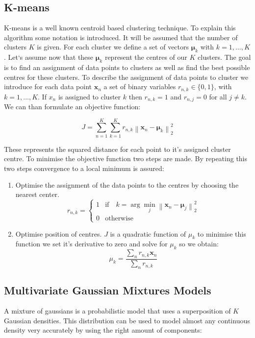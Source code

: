 \documentclass[cic,tc,english]{iiufrgs}
\newcommand{\norm}[1]{\left\lVert #1 \right\rVert_{2}}
\begin{document}
\subsection{K-means}
K-means is a well known centroid based clustering technique. To explain this algorithm some notation is introduced. It will be assumed that the number of clusters $K$ is given. For each cluster we define a set of vectors $\bm{\mu}_k$ with $k = 1,\ldots,K$. Let`s assume now that these $\bm{\mu}_k$ represent the centres of our $K$ clusters. The goal is to find an assignment of data points to clusters as well as find the best possible centres for these clusters. To describe the assignment of data points to cluster we introduce for each data point $\mathbf{x}_n$ a set of binary variables $r_{n,k} \in \{0,1\}$, with $k = 1,\ldots,K$. If $x_n$ is assigned to cluster $k$ then $r_{n,k} = 1$ and $r_{n,j} = 0$ for all $j \neq k$. We can than formulate an objective function:

\begin{equation}
J = \sum^{K}_{n=1} \sum^{K}_{k=1} r_{n,k} \norm{\mathbf{x}_n - \bm{\mu}_k}^2
\end{equation}

These represents the squared distance for each point to it's assigned cluster centre. To minimise the objective function two steps are made. By repeating this two steps convergence to a local minimum is assured\cite{bishop2006pattern}:
\begin{enumerate}
\item Optimise the assignment of the data points to the centres by choosing the nearest center. 
\begin{equation}
r_{n,k} = 
\begin{cases}
1 &\text{if} \quad k = \arg \min_j \norm{\mathbf{x}_n - \bm{\mu}_j}^2 \\
0 &\text{otherwise}
\end{cases}
\end{equation}
\item Optimise position of centres. $J$ is a quadratic function of $\mu_k$ to minimise this function we set it's derivative to zero and solve for $\mu_k$ so we obtain:
\begin{equation}
\mu_k = \frac{\sum_n r_{n,k}\mathbf{x}_n}{\sum_n r_{n,k}}
\end{equation}
\end{enumerate}

\subsection{Multivariate Gaussian Mixtures Models}
A mixture of gaussians is a probabilistic model that uses a superposition of $K$ Gaussian densities. This distribution can be used to model almost any continuous density very accurately by using the right amount of components:
\end{document}
